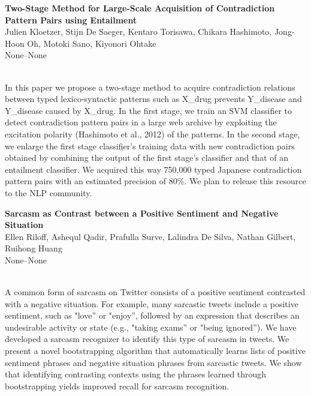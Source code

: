 \documentclass[twoside,makeidx]{book}
\begin{document}
\par\vspace{2em}\noindent%
\begin{minipage}{\linewidth}%
\begin{center}
\textbf{\normalsize Two-Stage Method for Large-Scale Acquisition of Contradiction Pattern Pairs using Entailment}\\
\normalsize  Julien Kloetzer,  Stijn De Saeger,  Kentaro Torisawa,  Chikara Hashimoto,  Jong-Hoon Oh,  Motoki Sano,  Kiyonori Ohtake\\
{\small None--None}\\
\end{center}
\end{minipage}\\[0.5em]
\nopagebreak%
\noindent%
{\small In this paper we propose a two-stage method to acquire contradiction relations between typed lexico-syntactic patterns such as X\_drug prevents Y\_disease and Y\_disease caused by X\_drug. In the first stage, we train an SVM classifier to detect contradiction pattern pairs in a large web archive by exploiting the excitation polarity (Hashimoto et al., 2012) of the patterns. In the second stage, we enlarge the first stage classifier's training data with new contradiction pairs obtained by combining the output of the first stage's classifier and that of an entailment classifier. We acquired this way 750,000 typed Japanese contradiction pattern pairs with an estimated precision of 80\%. We plan to release this resource to the NLP community.}
\par\vspace{2em}\noindent%
\begin{minipage}{\linewidth}%
\begin{center}
\textbf{\normalsize Sarcasm as Contrast between a Positive Sentiment and Negative Situation}\\
\normalsize  Ellen Riloff,  Ashequl Qadir,  Prafulla Surve,  Lalindra De Silva,  Nathan Gilbert,  Ruihong Huang\\
{\small None--None}\\
\end{center}
\end{minipage}\\[0.5em]
\nopagebreak%
\noindent%
{\small A common form of sarcasm on Twitter consists of a positive sentiment contrasted with a negative situation. For example, many sarcastic tweets include a positive sentiment, such as "love'' or "enjoy'', followed by an expression that describes an undesirable activity or state (e.g., "taking exams'' or "being ignored'').  We have developed a sarcasm recognizer to identify this type of sarcasm in tweets. We present a novel bootstrapping algorithm that automatically learns lists of positive sentiment phrases and negative situation phrases from sarcastic tweets. We show that identifying contrasting contexts using the phrases learned through bootstrapping yields improved recall for sarcasm recognition.}
\end{document}
